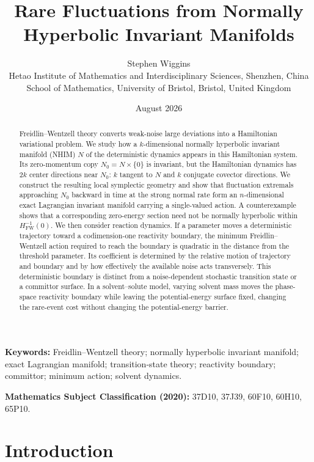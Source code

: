 \documentclass[11pt]{article}
\title{\textbf{Rare Fluctuations from Normally Hyperbolic Invariant Manifolds}}
\author{
Stephen Wiggins\\[0.5em]
\small Hetao Institute of Mathematics and Interdisciplinary Sciences, Shenzhen, China\\
\small School of Mathematics, University of Bristol, Bristol, United Kingdom
}
\date{August 2026}
\theoremstyle{definition}
\theoremstyle{remark}
\begin{document}
\maketitle

\begin{abstract}
Freidlin--Wentzell theory converts weak-noise large deviations into a Hamiltonian variational problem. We study how a $k$-dimensional normally hyperbolic invariant manifold (NHIM) $N$ of the deterministic dynamics appears in this Hamiltonian system. Its zero-momentum copy $N_0=N\times\{0\}$ is invariant, but the Hamiltonian dynamics has $2k$ center directions near $N_0$: $k$ tangent to $N$ and $k$ conjugate covector directions. We construct the resulting local symplectic geometry and show that fluctuation extremals approaching $N_0$ backward in time at the strong normal rate form an $n$-dimensional exact Lagrangian invariant manifold carrying a single-valued action. A counterexample shows that a corresponding zero-energy section need not be normally hyperbolic within $H_{\mathrm{FW}}^{-1}(0)$. We then consider reaction dynamics. If a parameter moves a deterministic trajectory toward a codimension-one reactivity boundary, the minimum Freidlin--Wentzell action required to reach the boundary is quadratic in the distance from the threshold parameter. Its coefficient is determined by the relative motion of trajectory and boundary and by how effectively the available noise acts transversely. This deterministic boundary is distinct from a noise-dependent stochastic transition state or a committor surface. In a solvent--solute model, varying solvent mass moves the phase-space reactivity boundary while leaving the potential-energy surface fixed, changing the rare-event cost without changing the potential-energy barrier.
\end{abstract}

\noindent\textbf{Keywords:} Freidlin--Wentzell theory; normally hyperbolic invariant manifold; exact Lagrangian manifold; transition-state theory; reactivity boundary; committor; minimum action; solvent dynamics.

\noindent\textbf{Mathematics Subject Classification (2020):} 37D10, 37J39, 60F10, 60H10, 65P10.

\section{Introduction}
\end{document}
